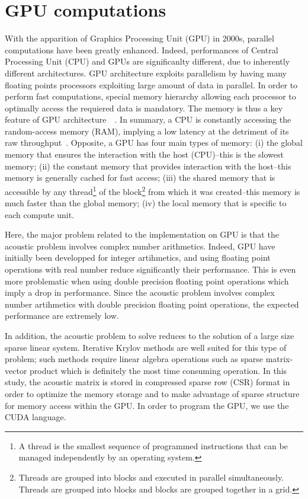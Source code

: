 \documentclass[10pt]{article}
\theoremstyle{plain}
\theoremstyle{definition}
\theoremstyle{remark}
\begin{document}
\section{GPU computations}

With the apparition of Graphics Processing Unit (GPU) in 2000s, parallel computations have been greatly enhanced.
Indeed, performances of Central Processing Unit (CPU) and GPUs are significanlty different, due to inherently different architectures.
GPU architecture exploits parallelism by having many floating points processors exploiting large amount of data in parallel.
In order to perform fast computations, special memory hierarchy allowing each processor to optimally access the requiered data is mandatory.
The memory is thus a key feature of GPU architecture~\cite{ref:cheikahamed:2012:inproceedings-1:DARG:2013}~\cite{ref:cheikahamed:2012:inproceedings-1:ZZ:2013}.
In summary, a CPU is constantly accessing the random-access memory (RAM), implying a low latency at the detriment of its raw throughput~\cite{ref:cheikahamed:2012:inproceedings-1:DARG:2013:b}.
Opposite, a GPU has four main types of memory: (i) the global memory that ensures the interaction with the host (CPU)--this is the slowest memory; (ii) the constant memory that provides interaction with the host--this memory is generally cached for fast access; (iii) the shared memory that is accessible by any thread\footnote{A thread is the smallest sequence of programmed instructions that can be managed independently by an operating system.} of the block\footnote{Threads are grouped into blocks and executed in parallel simultaneously. Threads are grouped into blocks and blocks are grouped together in a grid.} from which it was created--this memory is much faster than the global memory; (iv) the local memory that is specific to each compute unit.

Here, the major problem related to the implementation on GPU is that the acoustic problem involves complex number arithmetics.
Indeed, GPU have initially been developped for integer artihmetics, and using floating point operations with real number reduce significantly their performance.
This is even more problematic when using double precision floating point operations which imply a drop in performance.
Since the acoustic problem involves complex number artihmetics with double precision floating point operations, the expected performance are extremely low.

In addition, the acoustic problem to solve reduces to the solution of a large size sparse linear system.
Iterative Krylov methods are well suited for this type of problem; such methods require linear algebra operations such as sparse matrix-vector product which is definitely the most time consuming operation.
In this study, the acoustic matrix is stored in compressed sparse row (CSR) format in order to optimize the memory storage and to make advantage of sparse structure for memory access within the GPU.
In order to program the GPU, we use the CUDA language.
\end{document}
